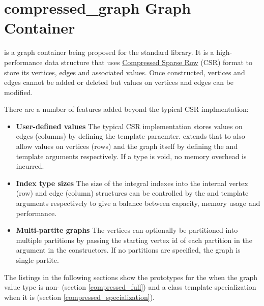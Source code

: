 
\clearpage

\section{compressed\_graph Graph Container}
 is a graph container being proposed for the standard library. It is a high-performance data structure that 
uses \href{https://en.wikipedia.org/wiki/Sparse_matrix#Compressed_sparse_row_\%28CSR\%2C_CRS_or_Yale_format\%29}{Compressed Sparse Row} 
(CSR) format to store its vertices, edges and associated values. Once constructed, vertices and edges cannot be added or deleted 
but values on vertices and edges can be modified.

There are a number of features added beyond the typical CSR implmentation:
\begin{itemize}
    \item   \textbf{User-defined values} The typical CSR implementation stores values on edges (columns) by defining the 
            template paraemter.  extends that to also allow values on vertices (rows) and the graph itself 
            by defining the  and  template arguments respectively. If a type is void, no memory overhead is incurred.
    \item   \textbf{Index type sizes} The size of the integral indexes into the internal vertex (row) and edge (column) structures can be 
            controlled by the  and  template arguments respectively to give a balance between capacity, memory 
            usage and performance.
    \item   \textbf{Multi-partite graphs} The vertices can optionally be partitioned into multiple partitions by passing the 
            starting vertex id of each partition in the  argument in the constructors. If no partitions are
            specified, the graph is single-partite.
\end{itemize}

The listings in the following sections show the prototypes for the  when the graph value type  is 
non- (section \ref{compressed_full}) and a class template specialization when it is  (section \ref{compressed_specialization}).

